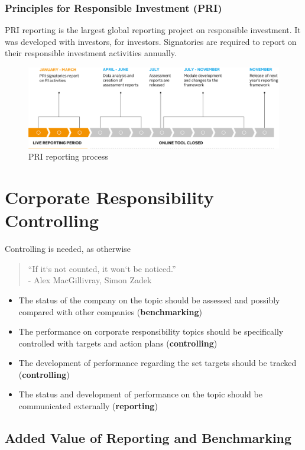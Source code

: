 \documentclass[11pt]{article}
\theoremstyle{definition}
\begin{document}
\subsubsection{Principles for Responsible Investment (PRI)}
PRI reporting is the largest global
reporting project on responsible investment. It was developed with investors, for investors. Signatories are required to report on their responsible investment activities annually.

\begin{figure}[H]
	\centering
	\includegraphics[width=0.8\linewidth]{img/PRI_reporting_process}
	\caption{PRI reporting process}
	\label{fig:prireportingprocess}
\end{figure}

\section{Corporate Responsibility Controlling}
Controlling is needed, as otherwise
\begin{quote}
	\textquotedblleft If it‘s not counted, it won‘t be noticed.\textquotedblright\\
	\hspace*{1em} - Alex MacGillivray, Simon Zadek
\end{quote}
\begin{itemize}
	\item The status of the company on the topic should be assessed and possibly compared with other companies (\textbf{benchmarking})
	\item The performance on corporate responsibility topics should be specifically controlled with targets and action plans (\textbf{controlling})
	\item The development of performance regarding the set targets should be tracked (\textbf{controlling})
	\item The status and development of performance on the topic should be communicated externally (\textbf{reporting})
\end{itemize}

\subsection{Added Value of Reporting and Benchmarking}
\end{document}
